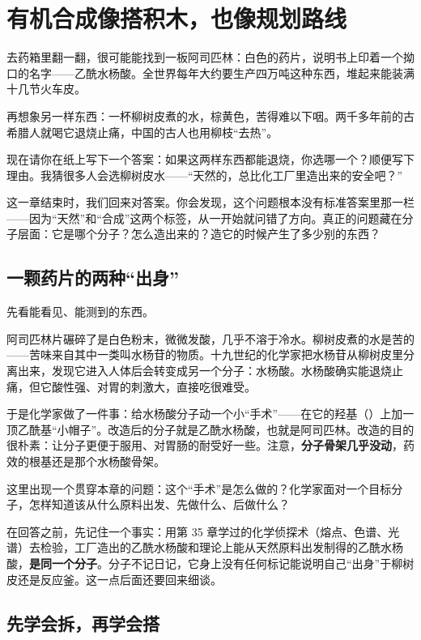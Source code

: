 \chapter{有机合成像搭积木，也像规划路线}

\begin{kaichang}
去药箱里翻一翻，很可能能找到一板阿司匹林：白色的药片，说明书上印着一个拗口的名字——乙酰水杨酸。全世界每年大约要生产四万吨这种东西，堆起来能装满十几节火车皮。

再想象另一样东西：一杯柳树皮煮的水，棕黄色，苦得难以下咽。两千多年前的古希腊人就喝它退烧止痛，中国的古人也用柳枝“去热”。

现在请你在纸上写下一个答案：如果这两样东西都能退烧，你选哪一个？顺便写下理由。我猜很多人会选柳树皮水——“天然的，总比化工厂里造出来的安全吧？”

这一章结束时，我们回来对答案。你会发现，这个问题根本没有标准答案里那一栏——因为“天然”和“合成”这两个标签，从一开始就问错了方向。真正的问题藏在分子层面：它是哪个分子？怎么造出来的？造它的时候产生了多少别的东西？
\end{kaichang}

\section{一颗药片的两种“出身”}

先看能看见、能测到的东西。

阿司匹林片碾碎了是白色粉末，微微发酸，几乎不溶于冷水。柳树皮煮的水是苦的——苦味来自其中一类叫水杨苷的物质。十九世纪的化学家把水杨苷从柳树皮里分离出来，发现它进入人体后会转变成另一个分子：水杨酸。水杨酸确实能退烧止痛，但它酸性强、对胃的刺激大，直接吃很难受。

于是化学家做了一件事：给水杨酸分子动一个小“手术”——在它的羟基（）上加一顶乙酰基“小帽子”。改造后的分子就是乙酰水杨酸，也就是阿司匹林。改造的目的很朴素：让分子更便于服用、对胃肠的耐受好一些。注意，\textbf{分子骨架几乎没动}，药效的根基还是那个水杨酸骨架。

这里出现一个贯穿本章的问题：这个“手术”是怎么做的？化学家面对一个目标分子，怎样知道该从什么原料出发、先做什么、后做什么？

在回答之前，先记住一个事实：用第 35 章学过的化学侦探术（熔点、色谱、光谱）去检验，工厂造出的乙酰水杨酸和理论上能从天然原料出发制得的乙酰水杨酸，\textbf{是同一个分子}。分子不记日记，它身上没有任何标记能说明自己“出身”于柳树皮还是反应釜。这一点后面还要回来细谈。

\section{先学会拆，再学会搭}

